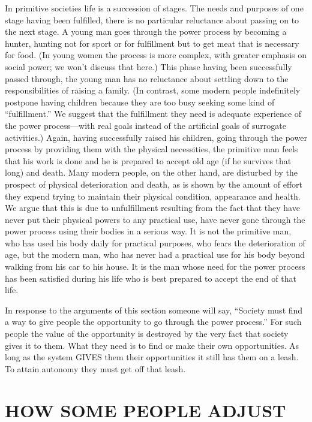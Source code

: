  In primitive societies life is a succession of stages. The needs and purposes of one stage having been fulfilled, there is no particular reluctance about passing on to the next stage. A young man goes through the power process by becoming a hunter, hunting not for sport or for fulfillment but to get meat that is necessary for food. (In young women the process is more complex, with greater emphasis on social power; we won’t discuss that here.) This phase having been successfully passed through, the young man has no reluctance about settling down to the responsibilities of raising a family. (In contrast, some modern people indefinitely postpone having children because they are too busy seeking some kind of “fulfillment.” We suggest that the fulfillment they need is adequate experience of the power process—with real goals instead of the artificial goals of surrogate activities.) Again, having successfully raised his children, going through the power process by providing them with the physical necessities, the primitive man feels that his work is done and he is prepared to accept old age (if he survives that long) and death. Many modern people, on the other hand, are disturbed by the prospect of physical deterioration and death, as is shown by the amount of effort they expend trying to maintain their physical condition, appearance and health. We argue that this is due to unfulfillment resulting from the fact that they have never put their physical powers to any practical use, have never gone through the power process using their bodies in a serious way. It is not the primitive man, who has used his body daily for practical purposes, who fears the deterioration of age, but the modern man, who has never had a practical use for his body beyond walking from his car to his house. It is the man whose need for the power process has been satisfied during his life who is best prepared to accept the end of that life.

 In response to the arguments of this section someone will say, “Society must find a way to give people the opportunity to go through the power process.” For such people the value of the opportunity is destroyed by the very fact that society gives it to them. What they need is to find or make their own opportunities. As long as the system GIVES them their opportunities it still has them on a leash. To attain autonomy they must get off that leash.

\chapter{HOW SOME PEOPLE ADJUST}

